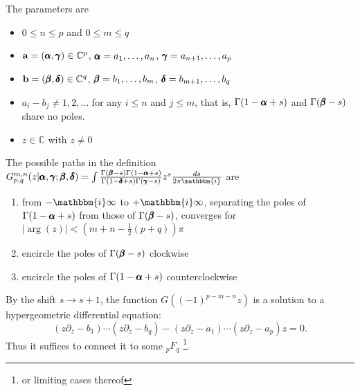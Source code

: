 \documentclass[12pt]{article}
\newcommand{\ii}[0] {\mathbbm{i}}
\numberwithin{equation}{section}
\newcommand{\bfa}[0] {\mathbf{a}}
\newcommand{\bfb}[0] {\mathbf{b}}
\begin{document}
The parameters are
\begin{itemize}
\item{$0 \le n \le p$ and $0 \le m \le q$}
\item{$\bfa = (\bfalpha, \bfgamma) \in \mathbb{C}^{p}$, $\pmb{\alpha} = a_1, \dots, a_n$, $\pmb{\gamma} = a_{n+1}, \dots, a_p$}
\item{$\bfb = (\bfbeta, \bfdelta) \in \mathbb{C}^{q}$, $\pmb{\beta} = b_1, \dots, b_m$, $\pmb{\delta} = b_{m+1}, \dots, b_q$}
\item{$a_i-b_j \neq 1, 2, \dots$ for any $i \le n$ and $j \le m$, that is, $\Gamma(1-\pmb{\alpha}+s)$ and $\Gamma(\pmb{\beta}-s)$ share no poles.}
\item{$z \in \mathbb{C}$ with $z \neq 0$}
\end{itemize}
The possible paths in the definition $ G_{p,q}^{m,n} (z |\bfalpha, \bfgamma; \bfbeta, \bfdelta) = \int \frac{\Gamma(\bfbeta-s)\Gamma(1-\bfalpha+s)}{\Gamma(1-\bfdelta+s)\Gamma(\bfgamma-s)}z^s\frac{ds}{2 \pi \ii}$ are
\begin{enumerate}
\item{from $-\ii \infty$ to $+ \ii \infty$, separating the poles of $\Gamma(1-\pmb{\alpha}+s)$ from those of $\Gamma(\pmb{\beta}-s)$, converges for $|\arg(z)| < (m+n-\tfrac{1}{2}(p+q)) \pi$}
\item{encircle the poles of $\Gamma(\pmb{\beta}-s)$ clockwise}
\item{encircle the poles of $\Gamma(1-\pmb{\alpha}+s)$ counterclockwise}
\end{enumerate}
By the shift $s \to s+1$, the function $G((-1)^{p-m-n}z)$ is a solution to a hypergeometric differential equation:
\begin{equation*}
(z \partial_z - b_1)\cdots (z \partial_z - b_q)-(z \partial_z - a_1) \cdots (z \partial_z - a_p) z = 0\text{.}
\end{equation*}
Thus it suffices to connect it to some ${}_p F_q$ \footnote{or limiting cases thereof}.
\end{document}
